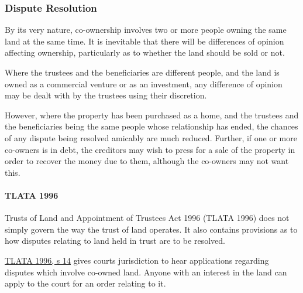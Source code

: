 \documentclass[
]{article}
\begin{document}
\hypertarget{dispute-resolution}{%
\subsubsection{Dispute Resolution}\label{dispute-resolution}}

By its very nature, co-ownership involves two or more people owning the
same land at the same time. It is inevitable that there will be
differences of opinion affecting ownership, particularly as to whether
the land should be sold or not.

Where the trustees and the beneficiaries are different people, and the
land is owned as a commercial venture or as an investment, any
difference of opinion may be dealt with by the trustees using their
discretion.

However, where the property has been purchased as a home, and the
trustees and the beneficiaries being the same people whose relationship
has ended, the chances of any dispute being resolved amicably are much
reduced. Further, if one or more co-owners is in debt, the creditors may
wish to press for a sale of the property in order to recover the money
due to them, although the co-owners may not want this.

\hypertarget{tlata-1996}{%
\paragraph{TLATA 1996}\label{tlata-1996}}

Trusts of Land and Appointment of Trustees Act 1996 (TLATA 1996) does
not simply govern the way the trust of land operates. It also contains
provisions as to how disputes relating to land held in trust are to be
resolved.

\href{https://www.legislation.gov.uk/ukpga/1996/47/section/14}{TLATA
1996, s 14} gives courts jurisdiction to hear applications regarding
disputes which involve co-owned land. Anyone with an interest in the
land can apply to the court for an order relating to it.
\end{document}
